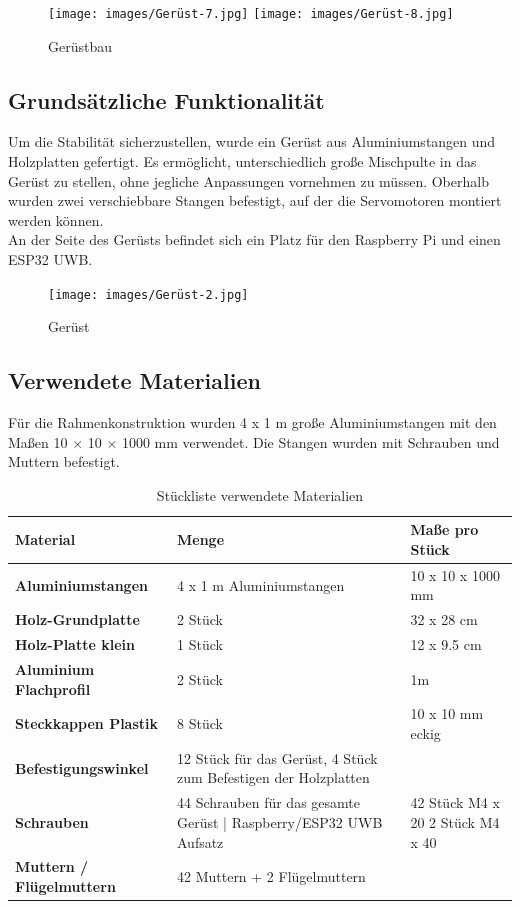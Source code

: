 \begin{figure}[H]
	\centering
	\texttt{[image: images/Gerüst-7.jpg]}
	\texttt{[image: images/Gerüst-8.jpg]}
	\caption[Gerüstbau]{Gerüstbau}
	\label{fig:Gerüstbau}
\end{figure}

\newpage
\subsection{Grundsätzliche Funktionalität}
Um die Stabilität sicherzustellen, wurde ein Gerüst aus Aluminiumstangen und Holzplatten gefertigt. Es ermöglicht, unterschiedlich große Mischpulte in das Gerüst zu stellen, ohne jegliche Anpassungen vornehmen zu müssen. Oberhalb wurden zwei verschiebbare Stangen befestigt, auf der die Servomotoren montiert werden können.\\
An der Seite des Gerüsts befindet sich ein Platz für den Raspberry Pi und einen ESP32 UWB.

\begin{figure}[H]
	\centering
	\texttt{[image: images/Gerüst-2.jpg]}
	\caption[Gerüst]{Gerüst}
	\label{fig:Gerüst-1}
\end{figure}


\newpage
\subsection{Verwendete Materialien}
Für die Rahmenkonstruktion wurden 4 x 1 m große Aluminiumstangen mit den Maßen 10 × 10 × 1000 mm verwendet. Die Stangen wurden mit Schrauben und Muttern befestigt.\\

\begin{table} [H]
	\begin{tabular}{ |p{3.3cm} |p{4.8cm}|p{4.8cm}| }
		\hline
		\textbf{Material} & \textbf{Menge}& \textbf{Maße pro Stück}\\
		\hline
		\textbf{Aluminiumstangen} & 4 x 1 m Aluminiumstangen & 10 x 10 x 1000 mm  \\ 
		\hline
		\textbf{Holz-Grundplatte} & 2 Stück & 32 x 28 cm   \\  
		\hline
		\textbf{Holz-Platte klein} & 1 Stück & 12 x 9.5 cm   \\  
		\hline
		\textbf{Aluminium Flachprofil} & 2 Stück  & 1m \\
		\hline
		\textbf{Steckkappen Plastik} & 8 Stück & 10 x 10 mm eckig  \\
		\hline
		\textbf{Befestigungswinkel}& 12 Stück für das Gerüst, 4 Stück zum Befestigen der Holzplatten   &  \\
		\hline
		\textbf{Schrauben}& 44 Schrauben für das gesamte Gerüst | 	Raspberry/ESP32 UWB Aufsatz & 42 Stück M4 x 20  2 Stück M4 x 40\\
		\hline
		\textbf{Muttern / Flügelmuttern}& 42 Muttern + 2 Flügelmuttern & \\
		\hline	
	\end{tabular}
	\caption{Stückliste verwendete Materialien} 
\end{table} 



